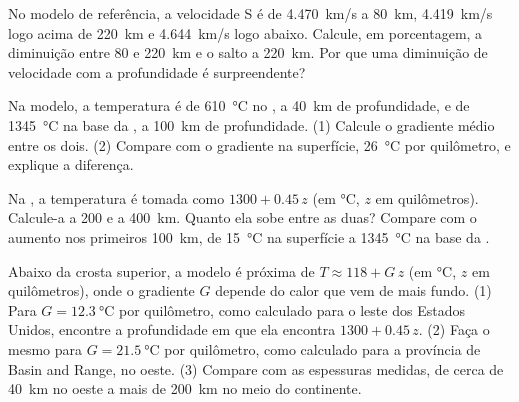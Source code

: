 \begin{exercise}[$\star\star$]\label{exo:g11:lithosphere-asthenosphere:9}
No modelo de referência, a velocidade S é de \qty{4.470}{km/s} a
\qty{80}{km}, \qty{4.419}{km/s} logo acima de \qty{220}{km} e
\qty{4.644}{km/s} logo abaixo. Calcule, em porcentagem, a diminuição entre
80 e \qty{220}{km} e o salto a \qty{220}{km}. Por que uma diminuição de
velocidade com a profundidade é surpreendente?
\end{exercise}

\begin{exercise}[$\star\star$]\label{exo:g11:lithosphere-asthenosphere:10}
Na  modelo, a temperatura é de \qty{610}{\celsius} no , a
\qty{40}{km} de profundidade, e de \qty{1345}{\celsius} na base da
, a \qty{100}{km} de profundidade. (1) Calcule o gradiente médio
entre os dois. (2) Compare com o gradiente na superfície,
\qty{26}{\celsius} por quilômetro, e explique a diferença.
\end{exercise}

\begin{exercise}[$\star\star$]\label{exo:g11:lithosphere-asthenosphere:11}
Na , a temperatura é tomada como $1300 + 0.45\,z$ (em
\unit{\celsius}, $z$ em quilômetros). Calcule-a a 200 e a \qty{400}{km}.
Quanto ela sobe entre as duas? Compare com o aumento nos primeiros
\qty{100}{km}, de \qty{15}{\celsius} na superfície a \qty{1345}{\celsius} na
base da .
\end{exercise}

\begin{exercise}[$\star\star\star$]\label{exo:g11:lithosphere-asthenosphere:12}
Abaixo da crosta superior, a  modelo é próxima de $T \approx 118 +
G\,z$ (em \unit{\celsius}, $z$ em quilômetros), onde o gradiente $G$
depende do calor que vem de mais fundo. (1) Para $G =
\qty{12.3}{\celsius}$ por quilômetro, como calculado para o leste dos
Estados Unidos, encontre a profundidade em que ela encontra $1300 + 0.45\,z$.
(2) Faça o mesmo para $G = \qty{21.5}{\celsius}$ por quilômetro, como
calculado para a província de Basin and Range, no oeste. (3) Compare com as
espessuras medidas, de cerca de \qty{40}{km} no oeste a mais de
\qty{200}{km} no meio do continente.
\end{exercise}

